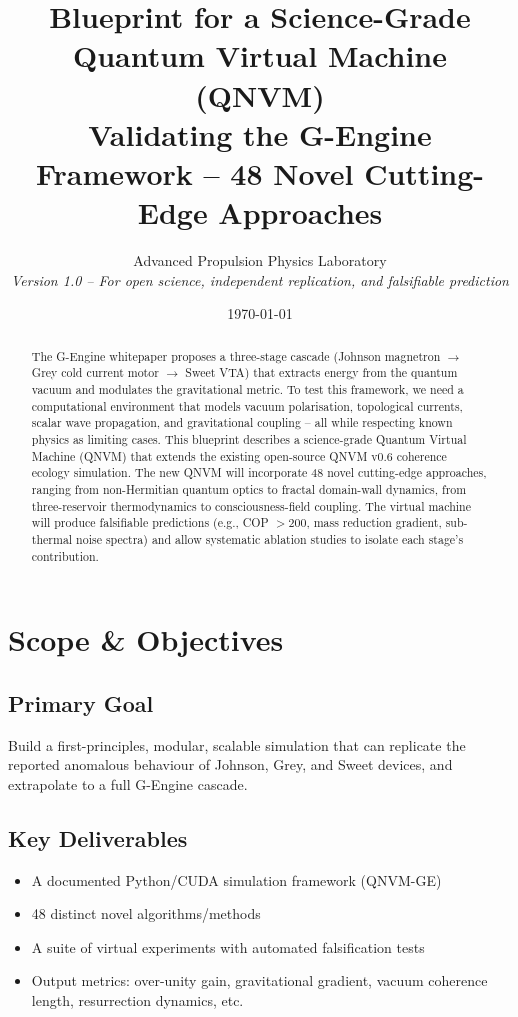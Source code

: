 \documentclass[11pt]{article}
\title{Blueprint for a Science-Grade Quantum Virtual Machine (QNVM)\\Validating the G-Engine Framework -- 48 Novel Cutting-Edge Approaches}
\author{Advanced Propulsion Physics Laboratory \\ \textit{Version 1.0 -- For open science, independent replication, and falsifiable prediction}}
\date{\today}
\begin{document}
\maketitle

\begin{abstract}
The G-Engine whitepaper proposes a three-stage cascade (Johnson magnetron $\to$ Grey cold current motor $\to$ Sweet VTA) that extracts energy from the quantum vacuum and modulates the gravitational metric. To test this framework, we need a computational environment that models vacuum polarisation, topological currents, scalar wave propagation, and gravitational coupling -- all while respecting known physics as limiting cases. This blueprint describes a science-grade Quantum Virtual Machine (QNVM) that extends the existing open-source QNVM v0.6 coherence ecology simulation. The new QNVM will incorporate 48 novel cutting-edge approaches, ranging from non-Hermitian quantum optics to fractal domain-wall dynamics, from three-reservoir thermodynamics to consciousness-field coupling. The virtual machine will produce falsifiable predictions (e.g., COP $> 200$, mass reduction gradient, sub-thermal noise spectra) and allow systematic ablation studies to isolate each stage's contribution.
\end{abstract}

\section{Scope \& Objectives}

\subsection{Primary Goal}
Build a first-principles, modular, scalable simulation that can replicate the reported anomalous behaviour of Johnson, Grey, and Sweet devices, and extrapolate to a full G-Engine cascade.

\subsection{Key Deliverables}
\begin{itemize}[nosep]
    \item A documented Python/CUDA simulation framework (QNVM-GE)
    \item 48 distinct novel algorithms/methods
    \item A suite of virtual experiments with automated falsification tests
    \item Output metrics: over-unity gain, gravitational gradient, vacuum coherence length, resurrection dynamics, etc.
\end{itemize}
\end{document}
